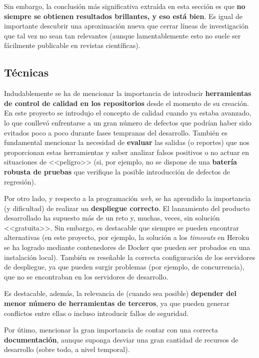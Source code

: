 Sin embargo, la conclusión más significativa extraída en esta sección es que \textbf{no siempre se obtienen resultados brillantes, y eso está bien}. Es igual de importante descubrir una aproximación nueva que cerrar líneas de investigación que tal vez no sean tan relevantes (aunque lamentablemente esto no suele ser fácilmente publicable en revistas científicas).

\subsection{Técnicas}

Indudablemente se ha de mencionar la importancia de introducir \textbf{herramientas de control de calidad en los repositorios} desde el momento de su creación. En este proyecto se introdujo el concepto de calidad cuando ya estaba avanzado, lo que conllevó enfrentarse a un gran número de defectos que podrían haber sido evitados poco a poco durante fases tempranas del desarrollo. También es fundamental mencionar la necesidad de \textbf{evaluar} las salidas (o reportes) que nos proporcionan estas herramientas y saber analizar falsos positivos o no actuar en situaciones de <<peligro>> (si, por ejemplo, no se dispone de una \textbf{batería robusta de pruebas} que verifique la posible introducción de defectos de regresión).

Por otro lado, y respecto a la programación \textit{web}, se ha aprendido la importancia (y dificultad) de realizar un \textbf{despliegue correcto}. El lanzamiento del producto desarrollado ha supuesto más de un reto y, muchas, veces, sin solución <<gratuita>>. Sin embargo, es destacable que siempre se pueden encontrar alternativas (en este proyecto, por ejemplo, la solución a los \textit{timeouts} en Heroku se ha logrado mediante contenedores de Docker que pueden ser probados en una instalación local). También es reseñable la correcta configuración de los servidores de despliegue, ya que pueden surgir problemas (por ejemplo, de concurrencia), que no se encontraban en los servidores de desarrollo.

Es destacable, además, la relevancia de (cuando sea posible) \textbf{depender del menor número de herramientas de terceros}, ya que pueden generar conflictos entre ellas o incluso introducir fallos de seguridad.

Por útimo, mencionar la gran importancia de contar con una correcta \textbf{documentación}, aunque suponga desviar una gran cantidad de recursos de desarrollo (sobre todo, a nivel temporal).

